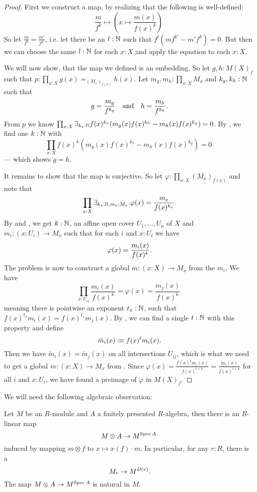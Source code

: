 \begin{proof}
First we construct a map, by realizing that the following is well-defined:
\[
  \frac{m}{f^k}\mapsto\left(x\mapsto \frac{m(x)}{f(x)^k}\right)
\]
So let $\frac{m}{f^k}=\frac{m'}{f^{k'}}$,
i.e. let there be an $l:\mathbb{N}$ such that $f^l(mf^{k'}-m'f^k)=0$.
But then we can choose the same $l:\mathbb{N}$ for each $x:X$
and apply the equation to each $x:X$.

We will now show, that the map we defined is an embedding.
So let $g,h:M(X)_f$ such that $p:\prod_{x:X}g(x)=_{(M_x)_{f(x)}}h(x)$.
Let $m_g,m_h:\prod_{x:X} M_x$ and $k_g,k_h:\mathbb{N}$ such that
\[
  g=\frac{m_g}{f^{k_g}} \quad\text{and}\quad h=\frac{m_h}{f^{k_h}}
  \rlap{.}
\]
From $p$ we know $\prod_{x:X}\exists_{k_x:\mathbb{N}}f(x)^{k_x}(m_g(x)f(x)^{k_h}-m_h(x)f(x)^{k_g})=0$.
By ,
we find one $k : \mathbb{N}$ with
\[
  \prod_{x:X}f(x)^{k}(m_g(x)f(x)^{k_h}-m_h(x)f(x)^{k_g})=0
\]
--- which shows $g=h$.

It remains to show that the map is surjective.
So let $\varphi:\prod_{x:X}(M_x)_{f(x)}$ and
note that
\[
  \prod_{x:X}
  \exists_{k_x:\N,m_x:M_x}.
  \varphi(x)=\frac{m_x}{f(x)^{k_x}}
  \rlap{.}
\]
By  and ,
we get $k:\mathbb{N}$, an affine open cover $U_1,\dots,U_n$ of $X$ and $m_i:(x : U_i)\to M_x$
such that for each $i$ and $x:U_i$ we have
\[
  \varphi(x)=\frac{m_i(x)}{f(x)^{k}}
  \rlap{.}
\]
The problem is now to construct a global $m:(x:X)\to M_x$ from the $m_i$.
We have
\[
    \prod_{x:U_{ij}}\frac{m_i(x)}{f(x)^k}=\varphi(x)=\frac{m_j(x)}{f(x)^k}
\]
meaning there is pointwise an exponent $t_x:\mathbb{N}$,
such that $f(x)^{t_x}m_i(x)=f(x)^{t_x}m_j(x)$.
By ,
we can find a single $t:\mathbb{N}$ with this property and define
\[
  \tilde{m}_i(x) \colonequiv f(x)^t m_i(x)
  \rlap{.}
\]
Then we have $\tilde{m}_i(x)=\tilde{m}_j(x)$ on all intersections $U_{ij}$,
which is what we need to get a global $m:(x:X)\to M_x$ from .
Since $\varphi(x)=\frac{f(x)^t m_i(x)}{f(x)^{t+k}}=\frac{\tilde{m}_i(x)}{f(x)^{t+k}}$
for all $i$ and $x : U_i$,
we have found a preimage of $\varphi$ in $M(X)_f$.
\end{proof}

We will need the following algebraic observation:

\begin{remark}%
  \label{localization-to-module-if-non-zero}
  Let $M$ be an $R$-module and $A$ a finitely presented $R$-algebra,
  then there is an $R$-linear map
  \[
    M\otimes A\to M^{\operatorname{Spec} A}
  \]
  induced by mapping $m\otimes f$ to $x\mapsto x(f)\cdot m$.
  In particular, for any $r:R$, there is a
  \[
    M_r\to M^{D(r)}
    \rlap{.}
  \]
  The map $M\otimes A\to M^{\operatorname{Spec} A}$ is natural in $M$.
\end{remark}

